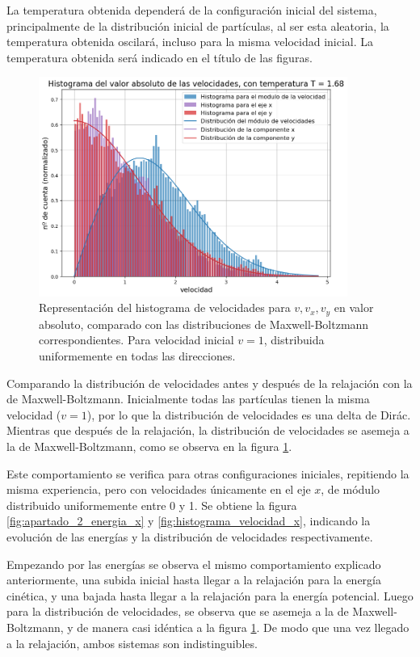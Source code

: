 \documentclass[11pt, twoside]{article} %
\begin{document}
La temperatura obtenida dependerá de la configuración inicial del sistema, 
principalmente de la distribución inicial de partículas, al ser esta aleatoria,
la temperatura obtenida oscilará, incluso para la misma velocidad inicial. 
La temperatura obtenida será indicado en el título de las figuras.

\begin{figure}[h!]
    \centering
    \includegraphics[width=0.9\textwidth]{plots/histograma_velocidad_1.png}
    \caption{Representación del histograma de velocidades para $v, v_x, v_y$ en valor
    absoluto, comparado con las distribuciones de Maxwell-Boltzmann correspondientes. 
    Para velocidad inicial $v=1$, distribuida uniformemente en todas las direcciones.}
    \label{fig:histograma_velocidad_1}
\end{figure}

Comparando la distribución de velocidades antes y después de la relajación con la 
de Maxwell-Boltzmann. Inicialmente todas las partículas tienen la misma velocidad
($v=1$), por lo que la distribución de velocidades es una delta de Dirác. Mientras 
que después de la relajación, la distribución de velocidades se asemeja a la de
Maxwell-Boltzmann, como se observa en la figura \ref{fig:histograma_velocidad_1}.

Este comportamiento se verifica para otras configuraciones iniciales, repitiendo la 
misma experiencia, pero con velocidades únicamente en el eje $x$, de módulo distribuido
uniformemente entre 0 y 1. Se obtiene la figura \ref{fig:apartado_2_energia_x} y 
\ref{fig:histograma_velocidad_x}, indicando la evolución de las energías y la distribución
de velocidades respectivamente.

Empezando por las energías se observa el mismo comportamiento explicado anteriormente, una 
subida inicial hasta llegar a la relajación para la energía cinética, y una bajada hasta 
llegar a la relajación para la energía potencial. Luego para la distribución de velocidades,
se observa que se asemeja a la de Maxwell-Boltzmann, y de manera casi idéntica a la 
figura \ref{fig:histograma_velocidad_1}. De modo que una vez llegado a la relajación,
ambos sistemas son indistinguibles.
\end{document}
